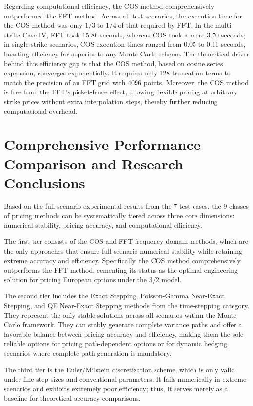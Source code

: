 Regarding computational efficiency, the COS method comprehensively outperformed the FFT method. Across all test scenarios, the execution time for the COS method was only $1/3$ to $1/4$ of that required by FFT. In the multi-strike Case IV, FFT took 15.86 seconds, whereas COS took a mere 3.70 seconds; in single-strike scenarios, COS execution times ranged from 0.05 to 0.11 seconds, boasting efficiency far superior to any Monte Carlo scheme. The theoretical driver behind this efficiency gap is that the COS method, based on cosine series expansion, converges exponentially. It requires only 128 truncation terms to match the precision of an FFT grid with 4096 points. Moreover, the COS method is free from the FFT's picket-fence effect, allowing flexible pricing at arbitrary strike prices without extra interpolation steps, thereby further reducing computational overhead.

\section{Comprehensive Performance Comparison and Research Conclusions}

Based on the full-scenario experimental results from the 7 test cases, the 9 classes of pricing methods can be systematically tiered across three core dimensions: numerical stability, pricing accuracy, and computational efficiency. 

The first tier consists of the COS and FFT frequency-domain methods, which are the only approaches that ensure full-scenario numerical stability while retaining extreme accuracy and efficiency. Specifically, the COS method comprehensively outperforms the FFT method, cementing its status as the optimal engineering solution for pricing European options under the 3/2 model. 

The second tier includes the Exact Stepping, Poisson-Gamma Near-Exact Stepping, and QE Near-Exact Stepping methods from the time-stepping category. They represent the only stable solutions across all scenarios within the Monte Carlo framework. They can stably generate complete variance paths and offer a favorable balance between pricing accuracy and efficiency, making them the sole reliable options for pricing path-dependent options or for dynamic hedging scenarios where complete path generation is mandatory. 

The third tier is the Euler/Milstein discretization scheme, which is only valid under fine step sizes and conventional parameters. It fails numerically in extreme scenarios and exhibits extremely poor efficiency; thus, it serves merely as a baseline for theoretical accuracy comparisons. 

